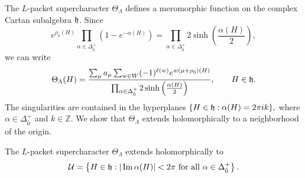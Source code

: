 The $L$-packet supercharacter $\Theta_\Lambda$ defines a meromorphic function on the complex Cartan subalgebra ${\mathfrak h}$. Since
\begin{equation}
e^{\rho_{\bar0}(H)}
\prod_{\alpha\in\Delta_{\bar0}^+}
(1-e^{-\alpha(H)})
=
\prod_{\alpha\in\Delta_{\bar0}^+}
2\sinh\left(\frac{\alpha(H)}{2}\right),
\end{equation}
we can write
\begin{equation}
\Theta_\Lambda(H)
=
\frac{
\sum_\mu a_\mu
\sum_{w\in W}(-1)^{\ell(w)}
e^{w(\mu+\rho_{\bar0})(H)}
}{
\prod_{\alpha\in\Delta_{\bar0}^+}
2\sinh\left(\frac{\alpha(H)}{2}\right)
},
\qquad H\in{\mathfrak h}.
\end{equation}
The singularities are contained in the hyperplanes 
$
\{H\in{\mathfrak h}:\alpha(H)=2\pi i k\},
$
where $\alpha\in\Delta_{\bar0}^+$ and $k\in\mathbb Z$. We show that $\Theta_\Lambda$ extends holomorphically
to a neighborhood of the origin.

\begin{lemma}\label{lemm::holomorphic}
The $L$-packet supercharacter $\Theta_\Lambda$ extends holomorphically to
\begin{equation*}
\mathcal U
=
\left\{
H\in{\mathfrak h}:
|\operatorname{Im}\alpha(H)|<2\pi
\text{ for all }\alpha\in\Delta_{\bar0}^+
\right\}.
\end{equation*}
\end{lemma}


